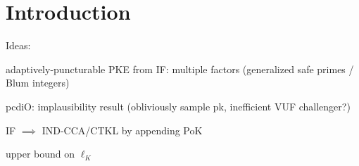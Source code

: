 \section{Introduction}
\label{sec:intro}

Ideas:
\begin{sitemize}
    \item adaptively-puncturable PKE from IF: multiple factors (generalized safe primes / Blum integers)
    \item pcdiO: implausibility result (obliviously sample pk, inefficient VUF challenger?)
    \item IF \(\implies\) IND-CCA/CTKL by appending PoK
    \item upper bound on \(\ell_K\)
\end{sitemize}